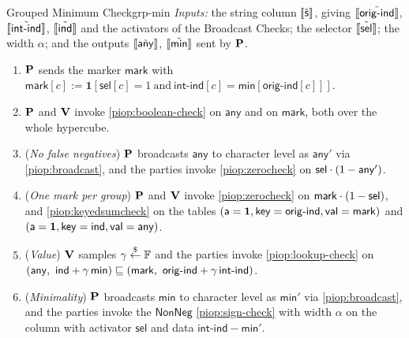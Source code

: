 \begin{DefinePIOP}{Grouped Minimum Check}{grp-min}
  \emph{Inputs:} the string column $\llbracket\hat{\mathsf{s}}\rrbracket$, giving $\llbracket\tilde{\mathsf{orig\text{-}ind}}\rrbracket$, $\llbracket\tilde{\mathsf{int\text{-}ind}}\rrbracket$, $\llbracket\tilde{\mathsf{ind}}\rrbracket$ and the activators of the Broadcast Checks; the selector $\llbracket\tilde{\mathsf{sel}}\rrbracket$; the width $\alpha$; and the outputs $\llbracket\tilde{\mathsf{any}}\rrbracket$, $\llbracket\tilde{\mathsf{min}}\rrbracket$ sent by $\bf{P}$.
  \begin{enumerate}[nosep]
    \item $\bf{P}$ sends the marker $\mathsf{mark}$ with $\mathsf{mark}[c] := \mathbf{1}[\mathsf{sel}[c] = 1 \ \text{and}\ \mathsf{int\text{-}ind}[c] = \mathsf{min}[\mathsf{orig\text{-}ind}[c]]]$.
    \item $\bf{P}$ and $\bf{V}$ invoke \cref{piop:boolean-check} on $\mathsf{any}$ and on $\mathsf{mark}$, both over the whole hypercube.
    \item (\emph{No false negatives}) $\bf{P}$ broadcasts $\mathsf{any}$ to character level as $\mathsf{any}'$ via \cref{piop:broadcast}, and the parties invoke \cref{piop:zerocheck} on $\mathsf{sel}\cdot(1-\mathsf{any}')$.
    \item (\emph{One mark per group}) $\bf{P}$ and $\bf{V}$ invoke \cref{piop:zerocheck} on $\mathsf{mark}\cdot(1-\mathsf{sel})$, and \cref{piop:keyedsumcheck} on the tables $(\mathsf{a} = \mathbf{1}, \mathsf{key} = \mathsf{orig\text{-}ind}, \mathsf{val} = \mathsf{mark})$ and $(\mathsf{a} = \mathbf{1}, \mathsf{key} = \mathsf{ind}, \mathsf{val} = \mathsf{any})$.
    \item (\emph{Value}) $\bf{V}$ samples $\gamma \overset{\$}{\leftarrow} \mathbb{F}$ and the parties invoke \cref{piop:lookup-check} on $(\mathsf{any},\ \mathsf{ind} + \gamma\,\mathsf{min}) \sqsubseteq (\mathsf{mark},\ \mathsf{orig\text{-}ind} + \gamma\,\mathsf{int\text{-}ind})$.
    \item (\emph{Minimality}) $\bf{P}$ broadcasts $\mathsf{min}$ to character level as $\mathsf{min}'$ via \cref{piop:broadcast}, and the parties invoke the $\mathsf{NonNeg}$ \cref{piop:sign-check} with width $\alpha$ on the column with activator $\mathsf{sel}$ and data $\mathsf{int\text{-}ind} - \mathsf{min}'$.
  \end{enumerate}
\end{DefinePIOP}

